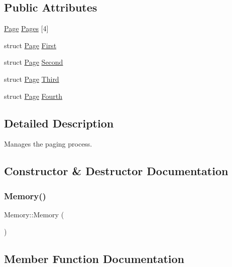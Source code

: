 \subsection*{Public Attributes}
\begin{DoxyCompactItemize}
\item 
\mbox{\hyperlink{structPage}{Page}} \mbox{\hyperlink{classMemory_a9cc9097c17efefe4dd48f2f1c34febd0}{Pages}} \mbox{[}4\mbox{]}
\item 
struct \mbox{\hyperlink{structPage}{Page}} \mbox{\hyperlink{classMemory_a0ca580503ffbb69a827aabba7d07de15}{First}}
\item 
struct \mbox{\hyperlink{structPage}{Page}} \mbox{\hyperlink{classMemory_a9ede2ac970e05bb7380e70b2948e3594}{Second}}
\item 
struct \mbox{\hyperlink{structPage}{Page}} \mbox{\hyperlink{classMemory_a5fa96206a626f01d0772aeeda0d3a83a}{Third}}
\item 
struct \mbox{\hyperlink{structPage}{Page}} \mbox{\hyperlink{classMemory_acc3cf7dc633add0087fb73343ecc974b}{Fourth}}
\end{DoxyCompactItemize}


\subsection{Detailed Description}
Manages the paging process. 

\subsection{Constructor \& Destructor Documentation}
\mbox{\label{classMemory_a585d7bb6fc6f2237bcebf94a86b7dd99}} 
\subsubsection{\texorpdfstring{Memory()}{Memory()}}
{\footnotesize\ttfamily Memory\+::\+Memory (\begin{DoxyParamCaption}{ }\end{DoxyParamCaption})}



\subsection{Member Function Documentation}
\mbox{\label{classMemory_a08387437b7d616155328f887808f65b7}} 

